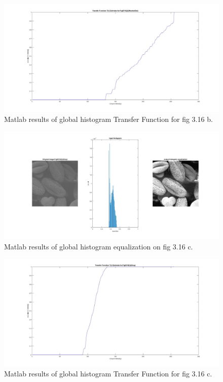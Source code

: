 \documentclass[./rarnold_report2.tex]{subfiles}
\begin{document}
\begin{enumerate}[a.]
	\begin{figure}[!htbp]
	\centering
	\includegraphics[scale=0.25]{"transfer2"}
	\caption{Matlab results of global histogram Transfer Function for fig 3.16 b.} 
	\label{Tr2}
	\end{figure}
	
	\begin{figure}[!htbp]
	\centering
	\includegraphics[scale=0.25]{"histo3"}
	\caption{Matlab results of global histogram equalization on fig 3.16 c.} 
	\label{histo3}
	\end{figure}
	
	\begin{figure}[!htbp]
	\centering
	\includegraphics[scale=0.25]{"transfer3"}
	\caption{Matlab results of global histogram Transfer Function for fig 3.16 c.} 
	\label{Tr3}
	\end{figure}
	

\end{enumerate}
\end{document}
